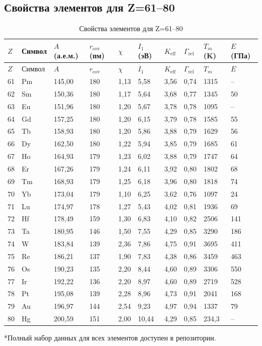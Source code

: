 \documentclass[12pt,a4paper]{article}
\newcommand{\Keff}{K_{\mathrm{eff}}}
\begin{document}
	\subsection*{Свойства элементов для Z=61–80}
	
	\begin{longtable}{p{0.6cm}p{1.2cm}p{1.2cm}p{1.2cm}p{1.2cm}p{1.2cm}p{1.5cm}p{1.2cm}p{1.2cm}p{1.2cm}}
		\caption{Свойства элементов для Z=61–80} \label{tab:elem-data-61to80} \\
		\toprule
		\(Z\) & Символ & \(A\) (а.е.м.) & \(r_{\text{cov}}\) (пм) & \(\chi\) & \(I_1\) (эВ) & \(\Keff\) & \(\Gamma_{\text{rel}}\) & \(T_m\) (K) & \(E\) (ГПа) \\
		\midrule
		\endfirsthead
		\toprule
		\(Z\) & Символ & \(A\) & \(r_{\text{cov}}\) & \(\chi\) & \(I_1\) & \(\Keff\) & \(\Gamma_{\text{rel}}\) & \(T_m\) & \(E\) \\
		\midrule
		\endhead
		61 & Pm & 145,00 & 180 & 1,13 & 5,58 & 3,56 & 0,74 & 1315 & – \\
		62 & Sm & 150,36 & 180 & 1,17 & 5,64 & 3,68 & 0,77 & 1345 & 50 \\
		63 & Eu & 151,96 & 180 & 1,20 & 5,67 & 3,78 & 0,78 & 1095 & – \\
		64 & Gd & 157,25 & 180 & 1,20 & 6,15 & 3,79 & 0,78 & 1585 & 55 \\
		65 & Tb & 158,93 & 180 & 1,20 & 5,86 & 3,88 & 0,79 & 1629 & 56 \\
		66 & Dy & 162,50 & 180 & 1,22 & 5,94 & 3,85 & 0,79 & 1685 & 61 \\
		67 & Ho & 164,93 & 179 & 1,23 & 6,02 & 3,88 & 0,79 & 1747 & 64 \\
		68 & Er & 167,26 & 179 & 1,24 & 6,11 & 3,92 & 0,80 & 1802 & 68 \\
		69 & Tm & 168,93 & 179 & 1,25 & 6,18 & 3,96 & 0,80 & 1818 & 74 \\
		70 & Yb & 173,04 & 179 & 1,10 & 6,25 & 3,62 & 0,76 & 1097 & 24 \\
		71 & Lu & 174,97 & 178 & 1,27 & 5,43 & 4,02 & 0,81 & 1936 & 69 \\
		72 & Hf & 178,49 & 159 & 1,30 & 6,83 & 4,10 & 0,82 & 2506 & 141 \\
		73 & Ta & 180,95 & 146 & 1,50 & 7,55 & 4,29 & 0,85 & 3290 & 186 \\
		74 & W  & 183,84 & 139 & 2,36 & 7,86 & 4,75 & 0,91 & 3695 & 411 \\
		75 & Re & 186,21 & 137 & 1,90 & 7,83 & 4,38 & 0,86 & 3459 & 463 \\
		76 & Os & 190,23 & 135 & 2,20 & 8,44 & 4,60 & 0,89 & 3306 & 550 \\
		77 & Ir & 192,22 & 136 & 2,20 & 8,97 & 4,60 & 0,89 & 2719 & 528 \\
		78 & Pt & 195,08 & 139 & 2,28 & 8,96 & 4,73 & 0,91 & 2041 & 168 \\
		79 & Au & 196,97 & 144 & 2,54 & 9,23 & 4,97 & 0,94 & 1337 & 79 \\
		80 & Hg & 200,59 & 151 & 2,00 & 10,44 & 4,29 & 0,85 & 234,3 & – \\
		\bottomrule
	\end{longtable}
	*Полный набор данных для всех элементов доступен в репозитории.
	
\end{document}
